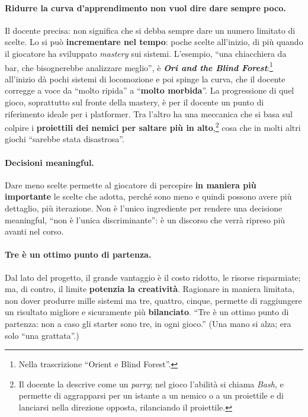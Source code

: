 \paragraph{Ridurre la curva d'apprendimento non vuol dire dare sempre poco.}
Il docente precisa: non significa che si debba sempre dare un numero limitato
di scelte. Lo si può \textbf{incrementare nel tempo}: poche scelte all'inizio,
di più quando il giocatore ha sviluppato \emph{mastery} sui sistemi.
L'esempio, ``una chiacchiera da bar, che bisognerebbe analizzare meglio'', è
\textbf{\emph{Ori and the Blind Forest}}:\footnote{Nella trascrizione
``Orient e Blind Forest''.} all'inizio dà pochi sistemi di locomozione e poi
spinge la curva, che il docente corregge a voce da ``molto ripida'' a
``\textbf{molto morbida}''. La progressione di quel gioco, soprattutto sul
fronte della mastery, è per il docente un punto di riferimento ideale per i
platformer. Tra l'altro ha una meccanica che si basa sul colpire i
\textbf{proiettili dei nemici per saltare più in alto},\footnote{Il docente
la descrive come un \emph{parry}; nel gioco l'abilità si chiama
\emph{Bash}, e permette di aggrapparsi per un istante a un nemico o a un
proiettile e di lanciarsi nella direzione opposta, rilanciando il proiettile.}
cosa che in molti altri giochi ``sarebbe stata disastrosa''.

\paragraph{Decisioni meaningful.} Dare meno scelte permette al giocatore di
percepire \textbf{in maniera più importante} le scelte che adotta, perché
sono meno e quindi possono avere più dettaglio, più iterazione. Non è
l'unico ingrediente per rendere una decisione meaningful, ``non è l'unica
discriminante'': è un discorso che verrà ripreso più avanti nel corso.

\paragraph{Tre è un ottimo punto di partenza.} Dal lato del progetto, il
grande vantaggio è il costo ridotto, le risorse risparmiate; ma, di contro,
il limite \textbf{potenzia la creatività}. Ragionare in maniera limitata, non
dover produrre mille sistemi ma tre, quattro, cinque, permette di raggiungere
un risultato migliore e sicuramente più \textbf{bilanciato}. ``Tre è un
ottimo punto di partenza: non a caso gli starter sono tre, in ogni gioco.''
(Una mano si alza; era solo ``una grattata''.)

